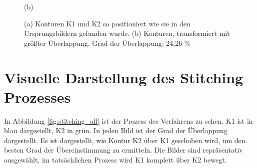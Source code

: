 \begin{figure}[h]
\begin{minipage}{0.49\textwidth}
        \caption*{(b)}
    \end{minipage}\hfill
    \caption{(a) Konturen K1 und K2 so positioniert wie sie in den
    Ursprungsbildern gefunden wurde.
    (b) Konturen, transformiert mit größter Überlappung, 
        Grad der Überlappung: 24,26 \%}
        \label{fig:k1_and_k2}
\end{figure}

\section{Visuelle Darstellung des Stitching Prozesses}

In Abbildung \ref{fig:stitching_all} ist der Prozess des Verfahrens zu sehen.
K1 ist in blau dargestellt, K2 in grün.
In jeden Bild ist der Grad der Überlappung dargestellt. Es ist dargestellt, wie
Kontur K2 über K1 geschoben wird, um den besten Grad der Übereinstimmung zu ermitteln.
Die Bilder sind repräsentativ ausgewählt, im tatsächlichen Prozess wird K1 komplett 
über K2 bewegt.


